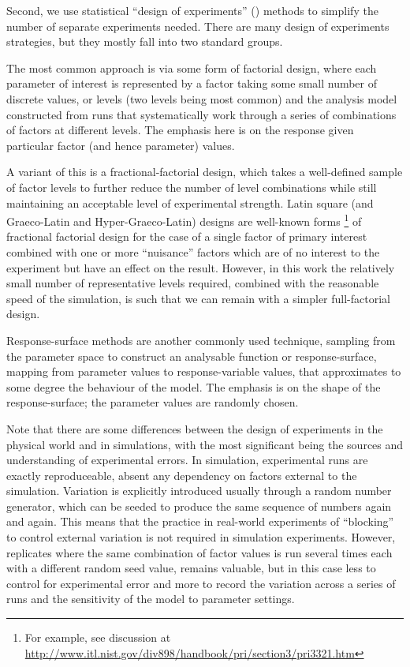 Second, we use statistical ``design of experiments'' (\eg \cite{Montgomery2009}) methods to simplify the number of separate experiments needed. There are many design of experiments strategies, but they mostly fall into two standard groups. 

The most common approach is via some form of factorial design, where each parameter of interest is represented by a factor taking some small number of discrete values, or levels (two levels being most common) and the analysis model constructed from runs that systematically work through a series of combinations of factors at different levels. The emphasis here is on the response given particular factor (and hence parameter) values. 

A variant of this is a fractional-factorial design, which takes a well-defined sample of factor levels to further reduce the number of level combinations while still maintaining an acceptable level of experimental strength. Latin square (and Graeco-Latin and Hyper-Graeco-Latin) designs are well-known forms \footnote{For example, see discussion at \url{http://www.itl.nist.gov/div898/handbook/pri/section3/pri3321.htm}} of fractional factorial design for the case of a single factor of primary interest combined with one or more ``nuisance'' factors which are of no interest to the experiment but have an effect on the result. However, in this work the relatively small number of representative levels required, combined with the reasonable speed of the simulation, is such that we can remain with a simpler full-factorial design.

Response-surface methods are another commonly used technique, sampling from the parameter space to construct an analysable function or response-surface, mapping from parameter values to response-variable values, that approximates to some degree the behaviour of the model. The emphasis is on the shape of the response-surface; the parameter values are randomly chosen.

Note that there are some differences between the design of experiments in the physical world and in simulations, with the most significant being the sources and understanding of experimental errors. In simulation, experimental runs are exactly reproduceable, absent any dependency on factors external to the simulation. Variation is explicitly introduced usually through a random number generator, which can be seeded to produce the same sequence of numbers again and again. This means that the practice in real-world experiments of ``blocking'' to control external variation is not required in simulation experiments. However, \gls{replicate}s where the same combination of factor values is run several times each with a different random seed value, remains valuable, but in this case less to control for experimental error and more to record the variation across a series of runs and the sensitivity of the model to parameter settings.

